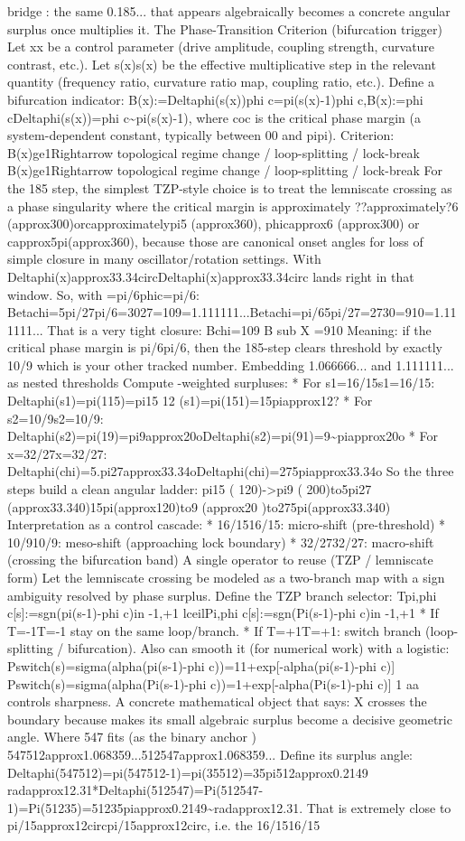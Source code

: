 bridge : the same 0.185... that appears algebraically becomes a concrete angular surplus once multiplies it. The Phase-Transition Criterion (bifurcation trigger) Let xx be a control parameter (drive amplitude, coupling strength, curvature contrast, etc.). Let s(x)s(x) be the effective multiplicative step in the relevant quantity (frequency ratio, curvature ratio map, coupling ratio, etc.). Define a bifurcation indicator: B(x):=Deltaphi(s(x))phi c=pi(s(x)-1)phi c,B(x):=phi cDeltaphi(s(x))=phi c\textasciitilde{}pi(s(x)-1), where coc is the critical phase margin (a system-dependent constant, typically between 00 and pipi). Criterion: B(x)ge1Rightarrow topological regime change / loop-splitting / lock-break B(x)ge1Rightarrow topological regime change / loop-splitting / lock-break For the 185 step, the simplest TZP-style choice is to treat the lemniscate crossing as a phase singularity where the critical margin is approximately ??approximately?6 (approx300)orcapproximatelypi5 (approx360), phicapprox6 (approx300) or capprox5pi(approx360), because those are canonical onset angles for loss of simple closure in many oscillator/rotation settings. With Deltaphi(x)approx33.34circDeltaphi(x)approx33.34circ lands right in that window. So, with =pi/6phic=pi/6: Betachi=5pi/27pi/6=3027=109=1.111111...Betachi=pi/65pi/27=2730=910=1.111111... That is a very tight closure: Bchi=109 B sub X =910 Meaning: if the critical phase margin is pi/6pi/6, then the 185-step clears threshold by exactly 10/9 which is your other tracked number. Embedding 1.066666... and 1.111111... as nested thresholds Compute -weighted surpluses: * For s1=16/15s1=16/15: Deltaphi(s1)=pi(115)=pi15 12 (s1)=pi(151)=15piapprox12? * For s2=10/9s2=10/9: Deltaphi(s2)=pi(19)=pi9approx20oDeltaphi(s2)=pi(91)=9\textasciitilde{}piapprox20o * For x=32/27x=32/27: Deltaphi(chi)=5.pi27approx33.34oDeltaphi(chi)=275piapprox33.34o So the three steps build a clean angular ladder: pi15 ( 120)->pi9 ( 200)to5pi27 (approx33.340)15pi(approx120)to9 (approx20 )to275pi(approx33.340) Interpretation as a control cascade: * 16/1516/15: micro-shift (pre-threshold) * 10/910/9: meso-shift (approaching lock boundary) * 32/2732/27: macro-shift (crossing the bifurcation band) A single operator to reuse (TZP / lemniscate form) Let the lemniscate crossing be modeled as a two-branch map with a sign ambiguity resolved by phase surplus. Define the TZP branch selector: Tpi,phi c[s]:=sgn(pi(s-1)-phi c)in -1,+1 lceilPi,phi c[s]:=sgn(Pi(s-1)-phi c)in -1,+1 * If T=-1T=-1 stay on the same loop/branch. * If T=+1T=+1: switch branch (loop-splitting / bifurcation). Also can smooth it (for numerical work) with a logistic: Pswitch(s)=sigma(alpha(pi(s-1)-phi c))=11+exp[-alpha(pi(s-1)-phi c)] Pswitch(s)=sigma(alpha(Pi(s-1)-phi c))=1+exp[-alpha(Pi(s-1)-phi c)] 1 aa controls sharpness. A concrete mathematical object that says: X crosses the boundary because makes its small algebraic surplus become a decisive geometric angle. Where 547 fits (as the binary anchor ) 547512approx1.068359...512547approx1.068359... Define its surplus angle: Deltaphi(547512)=pi(547512-1)=pi(35512)=35pi512approx0.2149 radapprox12.31*Deltaphi(512547)=Pi(512547-1)=Pi(51235)=51235piapprox0.2149\textasciitilde{}radapprox12.31. That is extremely close to pi/15approx12circpi/15approx12circ, i.e. the 16/1516/15 